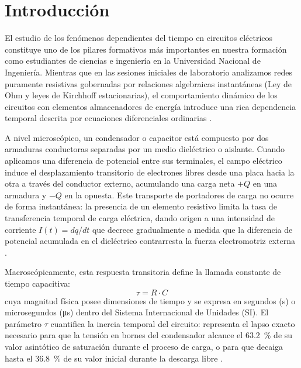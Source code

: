 
\section{Introducción}
\label{sec:introduccion}

El estudio de los fenómenos dependientes del tiempo en circuitos eléctricos constituye uno de los pilares formativos más importantes en nuestra formación como estudiantes de ciencias e ingeniería en la Universidad Nacional de Ingeniería. Mientras que en las sesiones iniciales de laboratorio analizamos redes puramente resistivas gobernadas por relaciones algebraicas instantáneas (Ley de Ohm y leyes de Kirchhoff estacionarias), el comportamiento dinámico de los circuitos con elementos almacenadores de energía introduce una rica dependencia temporal descrita por ecuaciones diferenciales ordinarias \cite{serway,halliday}.

A nivel microscópico, un condensador o capacitor está compuesto por dos armaduras conductoras separadas por un medio dieléctrico o aislante. Cuando aplicamos una diferencia de potencial entre sus terminales, el campo eléctrico induce el desplazamiento transitorio de electrones libres desde una placa hacia la otra a través del conductor externo, acumulando una carga neta $+Q$ en una armadura y $-Q$ en la opuesta. Este transporte de portadores de carga no ocurre de forma instantánea: la presencia de un elemento resistivo limita la tasa de transferencia temporal de carga eléctrica, dando origen a una intensidad de corriente $I(t) = dq/dt$ que decrece gradualmente a medida que la diferencia de potencial acumulada en el dieléctrico contrarresta la fuerza electromotriz externa \cite{boylestad}.

Macroscópicamente, esta respuesta transitoria define la llamada constante de tiempo capacitiva:
\begin{equation}
    \tau = R \cdot C
    \label{eq:intro_tau}
\end{equation}
cuya magnitud física posee dimensiones de tiempo y se expresa en segundos (\unit{\second}) o microsegundos (\unit{\micro\second}) dentro del Sistema Internacional de Unidades (SI). El parámetro $\tau$ cuantifica la inercia temporal del circuito: representa el lapso exacto necesario para que la tensión en bornes del condensador alcance el \qty{63,2}{\percent} de su valor asintótico de saturación durante el proceso de carga, o para que decaiga hasta el \qty{36,8}{\percent} de su valor inicial durante la descarga libre \cite{alexander}.

